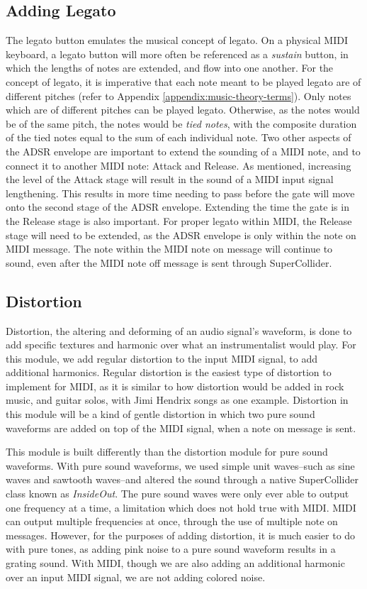 \subsection{Adding Legato}

The legato button emulates the musical concept of legato. On a physical MIDI keyboard, a legato button will more often be referenced as a \textit{sustain} button, in which the lengths of notes are extended, and flow into one another. For the concept of legato, it is imperative that each note meant to be played legato are of different pitches (refer to Appendix \ref{appendix:music-theory-terms}). Only notes which are of different pitches can be played legato. Otherwise, as the notes would be of the same pitch, the notes would be \textit{tied notes}, with the composite duration of the tied notes equal to the sum of each individual note. Two other aspects of the ADSR envelope are important to extend the sounding of a MIDI note, and to connect it to another MIDI note: Attack and Release. As mentioned, increasing the level of the Attack stage will result in the sound of a MIDI input signal lengthening. This results in more time needing to pass before the gate will move onto the second stage of the ADSR envelope. Extending the time the gate is in the Release stage is also important. For proper legato within MIDI, the Release stage will need to be extended, as the ADSR envelope is only within the note on MIDI message. The note within the MIDI note on message will continue to sound, even after the MIDI note off message is sent through SuperCollider.


\subsection{Distortion}

Distortion, the altering and deforming of an audio signal's waveform, is done to add specific textures and harmonic over what an instrumentalist would play. For this module, we add regular distortion to the input MIDI signal, to add additional harmonics. Regular distortion is the easiest type of distortion to implement for MIDI, as it is similar to how distortion would be added in rock music, and guitar solos, with Jimi Hendrix songs as one example. Distortion in this module will be a kind of gentle distortion in which two pure sound waveforms are added on top of the MIDI signal, when a note on message is sent. 

This module is built differently than the distortion module for pure sound waveforms. With pure sound waveforms, we used simple unit waves--such as sine waves and sawtooth waves--and altered the sound through a native SuperCollider class known as \textit{InsideOut}. The pure sound waves were only ever able to output one frequency at a time, a limitation which does not hold true with MIDI. MIDI can output multiple frequencies at once, through the use of multiple note on messages. However, for the purposes of adding distortion, it is much easier to do with pure tones, as adding pink noise to a pure sound waveform results in a grating sound. With MIDI, though we are also adding an additional harmonic over an input MIDI signal, we are not adding colored noise. 

